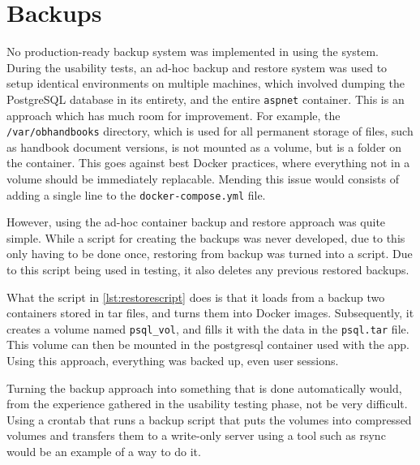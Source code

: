 \section{Backups}
No production-ready backup system was implemented in using the system.
During the usability tests, an ad-hoc backup and restore system was used to setup identical environments on multiple machines, which involved dumping the PostgreSQL database in its entirety, and the entire \texttt{aspnet} container.
This is an approach which has much room for improvement.
For example, the \texttt{/var/obhandbooks} directory, which is used for all permanent storage of files, such as handbook document versions, is not mounted as a volume, but is a folder on the container.
This goes against best Docker practices, where everything not in a volume should be immediately replacable.
Mending this issue would consists of adding a single line to the \texttt{docker-compose.yml} file.

However, using the ad-hoc container backup and restore approach was quite simple.
While a script for creating the backups was never developed, due to this only having to be done once, restoring from backup was turned into a script.
Due to this script being used in testing, it also deletes any previous restored backups.

What the script in \cref{lst:restorescript} does is that it loads from a backup two containers stored in tar files, and turns them into Docker images.
Subsequently, it creates a volume named \texttt{psql_vol}, and fills it with the data in the \texttt{psql.tar} file.
This volume can then be mounted in the postgresql container used with the app.
Using this approach, everything was backed up, even user sessions.

Turning the backup approach into something that is done automatically would, from the experience gathered in the usability testing phase, not be very difficult.
Using a crontab that runs a backup script that puts the volumes into compressed volumes and transfers them to a write-only server using a tool such as rsync would be an example of a way to do it.
